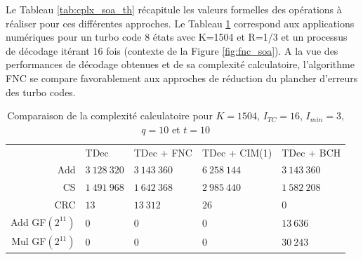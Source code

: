 Le Tableau \ref{tab:cplx_soa_th} récapitule les valeurs formelles des opérations à réaliser pour ces différentes approches.
Le Tableau \ref{tab:cplx_soa} correspond aux applications numériques pour un turbo code 8 états avec K=1504 et 
R=1/3 et un processus de décodage itérant 16 fois (contexte de la Figure \ref{fig:fnc_soa}). A la vue des performances de 
décodage obtenues et de sa complexité calculatoire, l'algorithme FNC se compare favorablement aux approches de réduction
du plancher d'erreurs des turbo codes.

\begin{table}[!t]
    \centering
    \caption{Comparaison de la complexité calculatoire pour les différentes approches de post-traitement des turbo codes, valeurs théoriques}
    \label{tab:cplx_soa_th}
\end{table}


\begin{table}[!t]
    \centering
    \caption{Comparaison de la complexité calculatoire pour $K=1504$, $I_{TC}=16$, $I_{min}=3$, $q=10$ et $t=10$ }
    \label{tab:cplx_soa}
        \begin{tabular}{rllll}
            \toprule
            		& TDec 			& TDec + FNC 	& TDec + CIM(1) & TDec + BCH \\
            \cmidrule(l){2-2}\cmidrule(l){3-3}\cmidrule(l){4-4}\cmidrule(l){5-5}
            Add 	& $3~128~320$ 	& $3~143~360$ 	& $6~258~144$ 	& $3~143~360$ \\
            CS  	& $1~491~968$ 	& $1~642~368$ 	& $2~985~440$ 	& $1~582~208$ \\
            CRC 	& $13$      	& $13~312$   	& $26$      	& $0$       \\
            Add GF$\left(2^{11}\right)$ & $0$ & $0$ &$0$			& $13~636$ \\
            Mul GF$\left(2^{11}\right)$ & $0$ & $0$ &$0$			& $30~243$ \\
            \bottomrule
        \end{tabular}%
\end{table}

